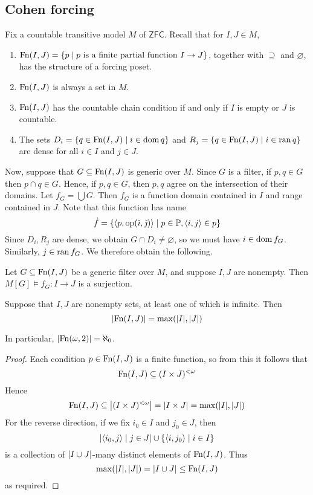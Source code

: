 \subsection{Cohen forcing}
Fix a countable transitive model \( M \) of \( \mathsf{ZFC} \).
Recall that for \( I, J \in M \),
\begin{enumerate}
    \item \( \operatorname{Fn}(I, J) = \qty{p \mid p \text{ is a finite partial function } I \to J} \), together with \( \supseteq \) and \( \varnothing \), has the structure of a forcing poset.
    \item \( \operatorname{Fn}(I, J) \) is always a set in \( M \).
    \item \( \operatorname{Fn}(I, J) \) has the countable chain condition if and only if \( I \) is empty or \( J \) is countable.
    \item The sets \( D_i = \qty{q \in \operatorname{Fn}(I, J) \mid i \in \operatorname{dom}q} \) and \( R_j = \qty{q \in \operatorname{Fn}(I, J) \mid i \in \operatorname{ran}q} \) are dense for all \( i \in I \) and \( j \in J \).
\end{enumerate}
Now, suppose that \( G \subseteq \operatorname{Fn}(I, J) \) is generic over \( M \).
Since \( G \) is a filter, if \( p, q \in G \) then \( p \cap q \in G \).
Hence, if \( p, q \in G \), then \( p, q \) agree on the intersection of their domains.
Let \( f_G = \bigcup G \).
Then \( f_G \) is a function domain contained in \( I \) and range contained in \( J \).
Note that this function has name
\[ \dot f = \qty{\langle p, \operatorname{op}(\check \imath, \check \jmath) \rangle \mid p \in \mathbb P, \langle i, j \rangle \in p} \]
Since \( D_i, R_j \) are dense, we obtain \( G \cap D_i \neq \varnothing \), so we must have \( i \in \operatorname{dom} f_G \).
Similarly, \( j \in \operatorname{ran} f_G \).
We therefore obtain the following.
\begin{proposition}
    Let \( G \subseteq \operatorname{Fn}(I, J) \) be a generic filter over \( M \), and suppose \( I, J \) are nonempty.
    Then \( M[G] \vDash f_G : I \to J \) is a surjection.
\end{proposition}
\begin{proposition}
    Suppose that \( I, J \) are nonempty sets, at least one of which is infinite.
    Then
    \[ \abs{\operatorname{Fn}(I, J)} = \max(\abs{I}, \abs{J}) \]
\end{proposition}
In particular, \( \abs{\operatorname{Fn}(\omega, 2)} = \aleph_0 \).
\begin{proof}
    Each condition \( p \in \operatorname{Fn}(I, J) \) is a finite function, so from this it follows that
    \[ \operatorname{Fn}(I, J) \subseteq (I \times J)^{<\omega} \]
    Hence
    \[ \operatorname{Fn}(I, J) \subseteq \abs{(I \times J)^{<\omega}} = \abs{I \times J} = \max(\abs{I}, \abs{J}) \]
    For the reverse direction, if we fix \( i_0 \in I \) and \( j_0 \in J \), then
    \[ \abs{\langle i_0, j \rangle \mid j \in J} \cup \qty{\langle i, j_0 \rangle \mid i \in I} \]
    is a collection of \( \abs{I \cup J} \)-many distinct elements of \( \operatorname{Fn}(I, J) \).
    Thus
    \[ \max(\abs{I}, \abs{J}) = \abs{I \cup J} \leq \operatorname{Fn}(I, J) \]
    as required.
\end{proof}
